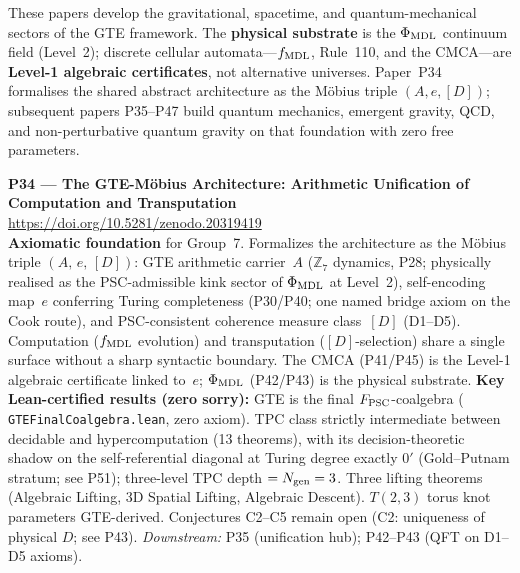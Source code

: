 \documentclass[11pt]{article}
\newcommand{\lean}[1]{%
  \penalty-100
  \begingroup\def\_{{\textunderscore\allowbreak}}\texttt{#1}\endgroup}
\begin{document}
These papers develop the gravitational, spacetime, and quantum-mechanical sectors
of the GTE framework.  The \textbf{physical substrate} is the $\Phi_{\rm MDL}$
continuum field (Level~2); discrete cellular automata---$f_{\rm MDL}$, Rule~110,
and the CMCA---are \textbf{Level-1 algebraic certificates}, not alternative
universes.  Paper~P34~\cite{SpivackGTEMobius} formalises the shared abstract
architecture as the Möbius triple $(A,e,[D])$; subsequent papers P35--P47 build
quantum mechanics, emergent gravity, QCD, and non-perturbative quantum gravity
on that foundation with zero free parameters.

\medskip
\noindent\textbf{P34 — The GTE-Möbius Architecture: Arithmetic Unification of
Computation and Transputation}~\cite{SpivackGTEMobius}\\
\url{https://doi.org/10.5281/zenodo.20319419}\\
\textbf{Axiomatic foundation} for Group~7.  Formalizes the architecture as the Möbius
triple $(A,\,e,\,[D])$: GTE arithmetic carrier~$A$ ($\mathbb{Z}_7$ dynamics, P28;
physically realised as the PSC-admissible kink sector of $\Phi_{\rm MDL}$ at
Level~2), self-encoding map~$e$ conferring Turing completeness (P30/P40; one named
bridge axiom on the Cook route), and PSC-consistent coherence measure class~$[D]$
(D1--D5).  Computation ($f_{\rm MDL}$ evolution) and transputation ($[D]$-selection)
share a single surface without a sharp syntactic boundary.  The CMCA (P41/P45) is
the Level-1 algebraic certificate linked to~$e$; $\Phi_{\rm MDL}$ (P42/P43) is
the physical substrate.
\textbf{Key Lean-certified results (zero sorry):}
GTE is the final $F_{\rm PSC}$-coalgebra (\lean{GTE\allowbreak{}Final\allowbreak{}Coalgebra.lean}, zero axiom).
TPC class strictly intermediate between decidable and hypercomputation (13 theorems),
with its decision-theoretic shadow on the self-referential diagonal at Turing degree
exactly $0'$ (Gold--Putnam stratum; see P51);
three-level TPC depth $= N_{\rm gen}=3$.  Three lifting theorems (Algebraic Lifting,
3D Spatial Lifting, Algebraic Descent).  $T(2,3)$ torus knot parameters GTE-derived.
Conjectures C2--C5 remain open (C2: uniqueness of physical $D$; see P43).
\emph{Downstream:} P35 (unification hub); P42--P43 (QFT on D1--D5 axioms).
\end{document}
